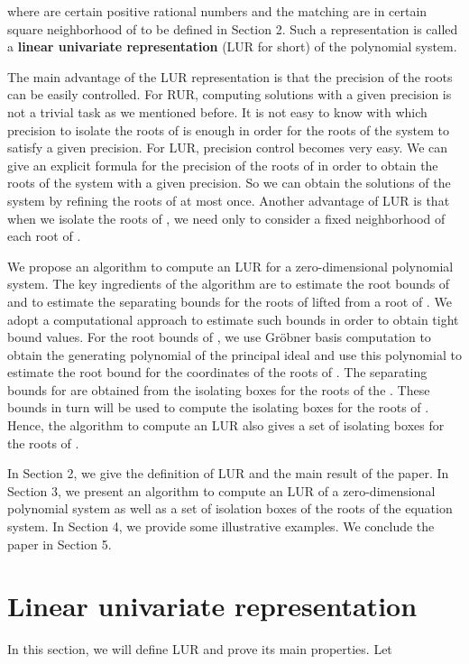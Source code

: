 \documentclass[amsthm]{JSC_LaTex_2007_Mar_12/elsart}
\begin{document}
where  are certain positive rational numbers and the
 matching  are in certain square
neighborhood of  to be defined in Section 2.
Such a representation is called a {\bf linear univariate
representation} (LUR for short)  of the polynomial system.

The main advantage of the LUR representation is that the precision
of the roots can be easily controlled. For RUR, computing solutions
with a given precision is not a trivial task as we mentioned before.
It is not easy to know with which precision to isolate the roots of
 is enough in order for the roots of the system 
to satisfy a given precision.
For LUR, precision control becomes very easy. We can give an
explicit formula for the precision of the roots of  in
order to obtain the roots of the system with a given precision. So
we can obtain the solutions of the system by refining the roots of
 at most once. Another advantage of LUR is that when we
isolate the roots of , we need only to consider a
fixed neighborhood of each root of .

We propose an algorithm to compute an LUR for a zero-dimensional
polynomial system. The key ingredients of the algorithm are to
estimate the root bounds of  and to estimate the separating
bounds for the roots of  lifted from a root of
. We adopt a computational approach to estimate such
bounds in order to obtain tight bound values. For the root bounds of
, we use Gr\"obner basis computation to obtain the generating
polynomial of the principal ideal  and use this
polynomial to estimate the root bound for the  coordinates of
the roots of .
The separating bounds for  are obtained from the isolating
boxes for the roots of the . These bounds in turn will be
used to compute the isolating boxes for the roots of .
Hence, the algorithm to compute an LUR also gives a set of isolating
boxes for the roots of .

In Section 2, we give the definition of LUR and the main result of
the paper.
In Section 3, we present an algorithm to compute an LUR of a
zero-dimensional polynomial system as well as a set of isolation
boxes of the roots of the equation system.
In Section 4, we provide some illustrative examples.
We conclude the paper in Section 5.


\section{Linear univariate representation}
In this section, we will define LUR and prove its main properties.
Let
\end{document}
